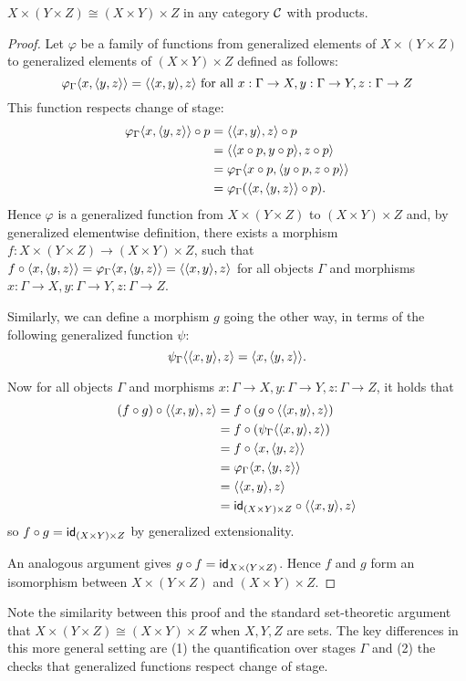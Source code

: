 \begin{proposition}
  \(X \times (Y\times Z) \cong (X \times Y) \times Z\)
  in any category \(\mathcal C\) with products.
\end{proposition}
\begin{proof}
  Let \(\varphi\) be a family of functions
  from generalized elements of \(X \times (Y\times Z)\)
  to generalized elements of \((X\times Y) \times Z\)
  defined as follows:
  \[
  \varphi_\Gamma\langle x,\langle y,z\rangle\rangle
  =\langle \langle x,y\rangle,z\rangle
  \text{ for all \(x:\Gamma\to X,y:\Gamma\to Y,z:\Gamma\to Z\)}
  \]
  This function respects change of stage:
  \begin{align}
    \varphi_\Gamma\langle x,\langle y,z\rangle\rangle\circ p
    &= \langle \langle x,y\rangle,z\rangle\circ p\\
    &= \langle \langle x\circ p,y\circ p\rangle,z \circ p\rangle\\
    &= \varphi_\Gamma\langle x\circ p,\langle y\circ p,z\circ p\rangle\rangle\\
    &= \varphi_\Gamma(\langle x,\langle y,z\rangle\rangle\circ p).
  \end{align}
  Hence \(\varphi\) is a generalized function from \(X \times (Y\times Z)\)
  to \((X\times Y) \times Z\) and,
  by generalized elementwise definition,
  there exists a morphism \(f : X \times (Y\times Z) \to (X\times Y) \times Z\),
  such that \(f\circ \langle x,\langle y,z\rangle\rangle
  = \varphi_\Gamma\langle x,\langle y,z\rangle\rangle
  = \langle \langle x,y\rangle,z\rangle\)
  for all objects \(\Gamma\) and morphisms \(x:\Gamma\to X,y:\Gamma\to Y,z:\Gamma\to Z\).

  Similarly, we can define a morphism \(g\) going the other way,
  in terms of the following generalized function \(\psi\):
  \[
  \psi_\Gamma\langle \langle x,y\rangle,z\rangle = \langle x,\langle y,z\rangle\rangle.
  \]

  Now for
  all objects \(\Gamma\) and morphisms \(x:\Gamma\to X,y:\Gamma\to Y,z:\Gamma\to Z\),
  it holds that
  \begin{align}
    (f\circ g)\circ \langle \langle x,y\rangle,z\rangle
    &= f\circ (g\circ \langle \langle x,y\rangle,z\rangle) \\
    &= f\circ (\psi_\Gamma\langle \langle x,y\rangle,z\rangle) \\
    &= f\circ \langle x,\langle y,z\rangle\rangle \\
    &= \varphi_\Gamma\langle x,\langle y,z\rangle\rangle \\
    &= \langle \langle x,y\rangle,z\rangle \\
    &= \mathsf{id}_{(X\times Y) \times Z} \circ \langle \langle x,y\rangle,z\rangle
  \end{align}
  so \(f\circ g = \mathsf{id}_{(X\times Y) \times Z}\)
  by generalized extensionality.

  An analogous argument gives \(g \circ f = \mathsf{id}_{X\times (Y\times Z)}\).
  Hence \(f\) and \(g\) form an isomorphism
  between \(X \times (Y\times Z)\) and \((X\times Y) \times Z\).
\end{proof}
Note the similarity between this proof and the standard set-theoretic
argument that \(X \times (Y\times Z) \cong (X \times Y) \times Z\)
when \(X,Y,Z\) are sets.
The key differences in this more general setting are (1)
the quantification over stages \(\Gamma\)
and (2) the checks that generalized functions respect change of stage.

